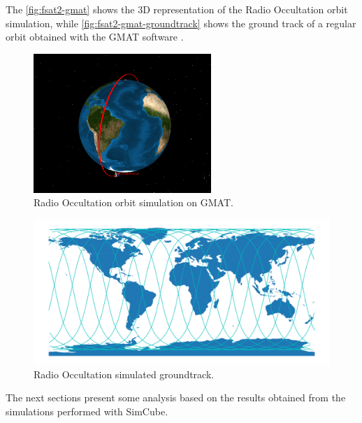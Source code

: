 The \autoref{fig:fsat2-gmat} shows the 3D representation of the Radio Occultation orbit simulation, while \autoref{fig:fsat2-gmat-groundtrack} shows the ground track of a regular orbit obtained with the GMAT software \cite{gmat}.

\begin{figure}[!ht]
    \begin{center}
        \includegraphics[width=0.6\textwidth]{figures/fsat2-gmat.png}
        \caption{Radio Occultation orbit simulation on GMAT.}
        \label{fig:fsat2-gmat}
    \end{center}
\end{figure}

\begin{figure}[!ht]
    \begin{center}
        \includegraphics[width=\textwidth]{figures/fsat2-gmat-groundtrack.pdf}
        \caption{Radio Occultation simulated groundtrack.}
        \label{fig:fsat2-gmat-groundtrack}
    \end{center}
\end{figure}

The next sections present some analysis based on the results obtained from the simulations performed with SimCube.%

